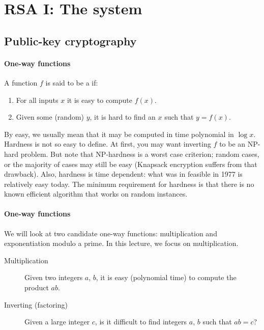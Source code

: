 \documentclass[a4paper, 11pt, openany]{book}
\begin{document}
\section{RSA I: The system}
\label{sec:14}


\subsection{Public-key cryptography}

\paragraph{One-way functions}
A function $f$ is said to be a  if:
\begin{enumerate}
    \item For all inputs $x$ it is easy to compute $f(x)$.

    \item Given some (random) $y$, it is hard to find an $x$ such that $y = f(x)$.
\end{enumerate}

By easy, we usually mean that it may be computed in time polynomial in $\log x$. Hardness is not so easy to define. At first, you may want inverting $f$ to be an NP-hard problem. But note that NP-hardness is a worst case criterion; random cases, or the majority of cases may still be easy (Knapsack encryption suffers from that drawback). Also, hardness is time dependent: what was in feasible in 1977 is relatively easy today. The minimum requirement for hardness is that there is no known efficient algorithm that works on random instances.




\paragraph{One-way functions}

We will look at two candidate one-way functions: multiplication and exponentiation modulo a prime. In this lecture, we focus on multiplication.

\begin{description}
\item [Multiplication] Given two integers $a$, $b$, it is easy (polynomial time) to compute the product $ab$.

\item[Inverting (factoring)] Given a large integer $c$, is it difficult to find integers $a$, $b$ such that $ab = c$?
\end{description}
\end{document}
